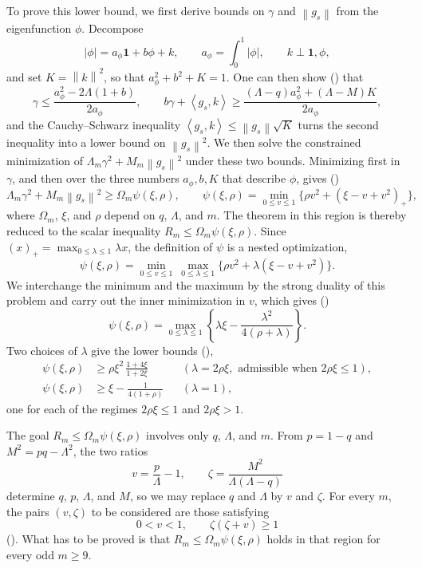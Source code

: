 \documentclass[11pt]{article}
\numberwithin{equation}{section}
\newcommand{\one}{\mathbf 1}
\newcommand{\ip}[2]{\left\langle #1,#2\right\rangle}
\newcommand{\norm}[1]{\left\lVert #1\right\rVert}
\newcommand{\pos}[1]{\left(#1\right)_{+}}
\begin{document}
\begin{enumerate}[label=\textbf{Section \arabic*.},leftmargin=4.6em,start=2]
  To prove this lower bound, we first derive bounds on $\gamma$ and $\norm{g_s}$ from the eigenfunction $\phi$.
  Decompose
  \[
    |\phi|=a_\phi\one+b\phi+k,
    \qquad a_\phi=\int_0^1|\phi|,
    \qquad k\perp\one,\phi,
  \]
  and set $K=\norm k^2$, so that $a_\phi^2+b^2+K=1$.
  One can then show () that
  \[
    \gamma\le\frac{a_\phi^2-2\Lambda(1+b)}{2a_\phi},
    \qquad
    b\gamma+\ip{g_s}k\ge
    \frac{(\Lambda-q)a_\phi^2+(\Lambda-M)K}{2a_\phi},
  \]
  and the Cauchy--Schwarz inequality $\ip{g_s}k\le\norm{g_s}\sqrt K$ turns the second inequality into a lower bound on $\norm{g_s}^2$.
  We then solve the constrained minimization of $\Lambda_m\gamma^2+M_m\norm{g_s}^2$ under these two bounds.
  Minimizing first in $\gamma$, and then over the three numbers $a_\phi,b,K$ that describe $\phi$, gives ()
  \[
    \Lambda_m\gamma^2+M_m\norm{g_s}^2\ge \Omega_m\psi(\xi,\rho),
    \qquad
    \psi(\xi,\rho)=\min_{0\le v\le1}
    \bigl\{\rho v^2+\pos{\xi-v+v^2}\bigr\},
  \]
  where $\Omega_m$, $\xi$, and $\rho$ depend on $q$, $\Lambda$, and $m$.
  The theorem in this region is thereby reduced to the scalar inequality $R_m\le \Omega_m\psi(\xi,\rho)$.
  Since $\pos x=\max_{0\le\lambda\le1}\lambda x$, the definition of $\psi$ is a nested optimization,
  \[
    \psi(\xi,\rho)=\min_{0\le v\le1}\ \max_{0\le\lambda\le1}
    \bigl\{\rho v^2+\lambda(\xi-v+v^2)\bigr\}.
  \]
  We interchange the minimum and the maximum by the strong duality of this problem and carry out the inner minimization in $v$, which gives ()
  \[
    \psi(\xi,\rho)=\max_{0\le\lambda\le1}
    \left\{\lambda\xi-\frac{\lambda^2}{4(\rho+\lambda)}\right\}.
  \]
  Two choices of $\lambda$ give the lower bounds (),
  \begin{align*}
    \psi(\xi,\rho)&\ge\rho\xi^2\,\frac{1+4\xi}{1+2\xi}
    &&(\lambda=2\rho\xi,\text{ admissible when }2\rho\xi\le1),\\
    \psi(\xi,\rho)&\ge\xi-\frac{1}{4(1+\rho)}
    &&(\lambda=1),
  \end{align*}
  one for each of the regimes $2\rho\xi\le1$ and $2\rho\xi>1$.

  The goal $R_m\le \Omega_m\psi(\xi,\rho)$ involves only $q$, $\Lambda$, and $m$.
  From $p=1-q$ and $M^2=pq-\Lambda^2$, the two ratios
  \[
    v=\frac {p}{\Lambda}-1,
    \qquad
    \zeta=\frac{M^2}{\Lambda(\Lambda-q)}
  \]
  determine $q$, $p$, $\Lambda$, and $M$, so we may replace $q$ and $\Lambda$ by $v$ and $\zeta$.
  For every $m$, the pairs $(v,\zeta)$ to be considered are those satisfying
  \[
    0<v<1,
    \qquad
    \zeta(\zeta+v)\ge1
  \]
  ().
  What has to be proved is that $R_m\le \Omega_m\psi(\xi,\rho)$ holds in that region for every odd $m\ge9$.


\end{enumerate}
\end{document}

